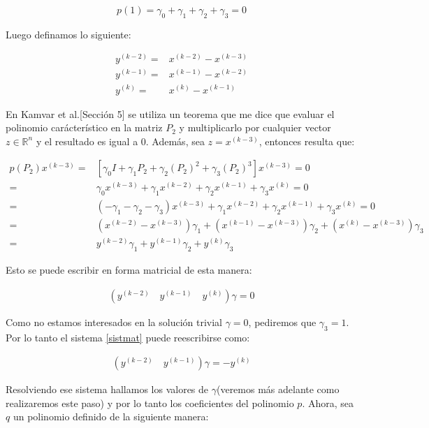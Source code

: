 \[
	p(1) = \gamma_{0} + \gamma_{1} + \gamma_{2} + \gamma_{3} = 0
\]

Luego definamos lo siguiente:

\begin{align*}
	y^{(k-2)} =& x^{(k-2)}- x^{(k-3)} \\
	y^{(k-1)} =& x^{(k-1)}- x^{(k-2)}\\
	y^{(k)} =& x^{(k)}- x^{(k-1)}
\end{align*}

En Kamvar et al.[Secci\'on 5]\cite{Kamvar2003} se utiliza un teorema que me dice que evaluar el polinomio car\'acter\'istico en la matriz $P_{2}$ y multiplicarlo por cualquier vector $z \in \mathbb{R}^{n}$ y el resultado es igual a 0. Adem\'as, sea $z = x^{(k-3)}$, entonces resulta que:

\begin{align*}
	p(P_{2})x^{(k-3)}	=& [\gamma_{0}I + \gamma_{1}P_{2} + \gamma_{2}(P_{2})^{2} + \gamma_{3}(P_{2})^{3}]x^{(k-3)} = 0 \\
						=& \gamma_{0}x^{(k-3)} + \gamma_{1}x^{(k-2)} + \gamma_{2}x^{(k-1)} + \gamma_{3}x^{(k)}= 0 \\
						=& (- \gamma_{1} - \gamma_{2} - \gamma_{3})x^{(k-3)} + \gamma_{1}x^{(k-2)} + \gamma_{2}x^{(k-1)} + \gamma_{3}x^{(k)}= 0 \\
						=& (x^{(k-2)}- x^{(k-3)})\gamma_{1} + (x^{(k-1)}- x^{(k-3)})\gamma_{2} + (x^{(k)}- x^{(k-3)})\gamma_{3}\\
						=& y^{(k-2)}\gamma_{1} + y^{(k-1)}\gamma_{2} + y^{(k)}\gamma_{3}
\end{align*}

Esto se puede escribir en forma matricial de esta manera:

\begin{align}
	\left(y^{(k-2)} \quad  y^{(k-1)} \quad  y^{(k)}\right)\gamma = 0 \label{sistmat}
\end{align}

Como no estamos interesados en la soluci\'on trivial $\gamma = 0$, pediremos que $\gamma_{3} = 1$. Por lo tanto el sistema \eqref{sistmat} puede reescribirse como:

\begin{align}
	\left(y^{(k-2)} \quad y^{(k-1)}\right)\gamma = - y^{(k)} \label{sistmat2}
\end{align}

Resolviendo ese sistema hallamos los valores de $\gamma$(veremos m\'as adelante como realizaremos este paso) y por lo tanto los coeficientes del polinomio $p$. Ahora, sea $q$ un polinomio definido de la siguiente manera:


